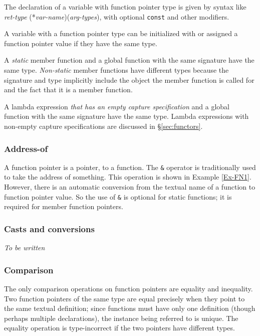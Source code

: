 The declaration of a variable with function pointer type is given by syntax like\\
\emph{ret-type} (*\emph{var-name})(\emph{arg-types}), with optional \lstinline|const| and other modifiers.

A variable with a function pointer type can be initialized with or assigned a function pointer value if they have the same type.

A \emph{static} member function and
a global function with the same signature have the same type.
\emph{Non-static} member functions have different types because
the signature and type implicitly include the object the member function
is called for and the fact that it is a member function.

A lambda expression \emph{that has an empty capture specification} and
a global function with the same signature have the same type.
Lambda expressions with non-empty capture specifications are discussed 
in \S\ref{sec:functors}.

\subsubsection{Address-of}

A function pointer is a pointer, to a function. 
The \lstinline|&| operator is traditionally used to take
the address of something. 
This operation is shown in Example \ref{Ex-FN1}.
However, there is an automatic conversion from the textual
name of a function to function pointer value. 
So the use of \lstinline|&| is optional for static functions; it is required for member function pointers.

\subsubsection{Casts and conversions}

\textit{To be written}

\subsubsection{Comparison}

The only comparison operations on function pointers are 
equality and inequality. Two function pointers of the 
same type are equal precisely when they point to the same
textual definition; since functions must have only one
definition (though perhaps multiple declarations), 
the instance being referred to is unique. 
The equality operation is type-incorrect if the two
pointers have different types.

